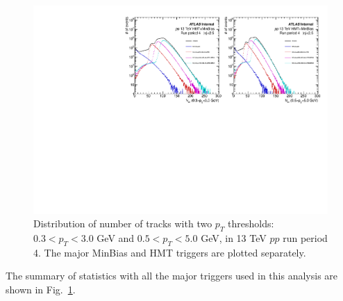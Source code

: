 \begin{figure}[H]
\centering
\includegraphics[width=.9\linewidth]{figs/sec_evtSlc/trkDis_pp13_run4.pdf}
\caption{Distribution of number of tracks with two $p_{T}$ thresholds: $0.3<p_{T}<3.0$ GeV and $0.5<p_{T}<5.0$ GeV, in 13 TeV $pp$ run period 4. The major MinBias and HMT triggers are plotted separately.}
\label{fig:trkDis_pp13_run4}
\end{figure}
The summary of statistics with all the major triggers used in this analysis are shown in Fig.~\ref{fig:trkDis_pp13_run4}.

